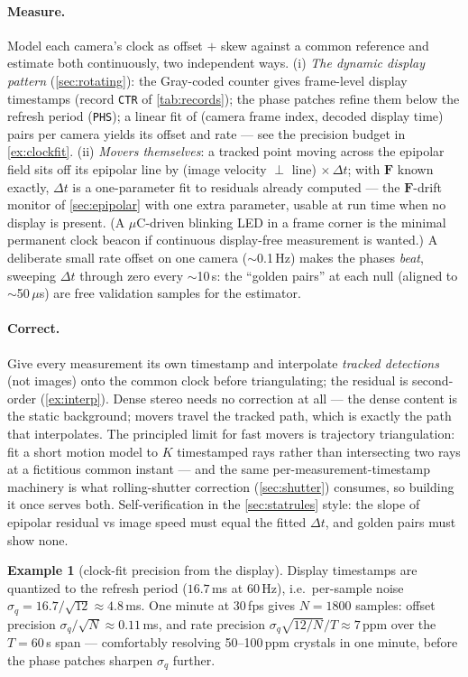 \documentclass[11pt]{article}
\theoremstyle{definition}
\newtheorem{example}{Example}
\newcommand{\mat}[1]{\mathbf{#1}}
\newcommand{\F}{\mat{F}}
\newcommand{\code}[1]{\texttt{#1}}
\begin{document}
\paragraph{Measure.} Model each camera's clock as offset $+$ skew
against a common reference and estimate both continuously, two
independent ways. (i) \emph{The dynamic display pattern}
(\autoref{sec:rotating}): the Gray-coded counter gives frame-level
display timestamps (record \code{CTR} of \autoref{tab:records}); the
phase patches refine them below the refresh period (\code{PHS}); a
linear fit of (camera frame index, decoded display time) pairs per
camera yields its offset and rate --- see the precision budget in
\autoref{ex:clockfit}. (ii) \emph{Movers themselves}: a tracked point moving
across the epipolar field sits off its epipolar line by (image velocity
$\perp$ line)$\,\times\Delta t$; with $\F$ known exactly, $\Delta t$ is a
one-parameter fit to residuals already computed --- the $\F$-drift
monitor of \autoref{sec:epipolar} with one extra parameter, usable at
run time when no display is present. (A $\mu$C-driven blinking LED in a
frame corner is the minimal permanent clock beacon if continuous
display-free measurement is wanted.) A deliberate small rate offset on
one camera ($\sim$0.1\,Hz) makes the phases \emph{beat}, sweeping
$\Delta t$ through zero every $\sim$10\,s: the ``golden pairs'' at each
null (aligned to $\sim$50\,$\mu$s) are free validation samples for the
estimator.

\paragraph{Correct.} Give every measurement its own timestamp and
interpolate \emph{tracked detections} (not images) onto the common
clock before triangulating; the residual is second-order
(\autoref{ex:interp}). Dense stereo needs no correction at all --- the
dense content is the static background; movers travel the tracked
path, which is exactly the path that interpolates. The principled limit
for fast movers is trajectory triangulation: fit a short motion model to
$K$ timestamped rays rather than intersecting two rays at a fictitious
common instant --- and the same per-measurement-timestamp machinery is
what rolling-shutter correction (\autoref{sec:shutter}) consumes, so
building it once serves both. Self-verification in the
\autoref{sec:statrules} style: the slope of epipolar residual vs image
speed must equal the fitted $\Delta t$, and golden pairs must show none.

\begin{example}[clock-fit precision from the display]
\label{ex:clockfit}
Display timestamps are quantized to the refresh period
($16.7$\,ms at 60\,Hz), i.e.\ per-sample noise
$\sigma_q=16.7/\sqrt{12}\approx4.8$\,ms. One minute at 30\,fps gives
$N=1800$ samples: offset precision $\sigma_q/\sqrt N\approx0.11$\,ms,
and rate precision
$\sigma_q\sqrt{12/N}/T\approx7$\,ppm over the $T=60$\,s span ---
comfortably resolving 50--100\,ppm crystals in one minute, before the
phase patches sharpen $\sigma_q$ further.
\end{example}
\end{document}
